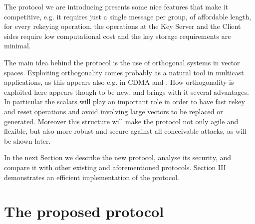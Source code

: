 \documentclass[a4paper,11pt]{amsart}
\theoremstyle{definition}
\begin{document}
The protocol we are introducing presents some nice features that make
it competitive, e.g. it requires just a single message per group, of
affordable length, for every rekeying operation, the operations at the
Key Server and the Client sides require low computational cost and the
key storage requirements are minimal.

The main idea behind the protocol is the use of orthogonal systems in
vector spaces. Exploiting orthogonality comes probably as a natural
tool in multicast applications, as this appears also e.g. in CDMA and
\cite{wang}. How orthogonality is exploited here appears though to be
new, and brings with it several advantages. In particular the scalars
will play an important role in order to have fast rekey and reset
operations and avoid involving large vectors to be replaced or
generated. Moreover this structure will make the protocol not only
agile and flexible, but also more robust and secure against all
conceivable attacks, as will be shown later.

In the next Section we describe the new protocol, analyse its
security, and compare it with other existing and aforementioned
protocols. Section III demonstrates an efficient implementation of the
protocol. 


\section{The proposed protocol}
\end{document}
